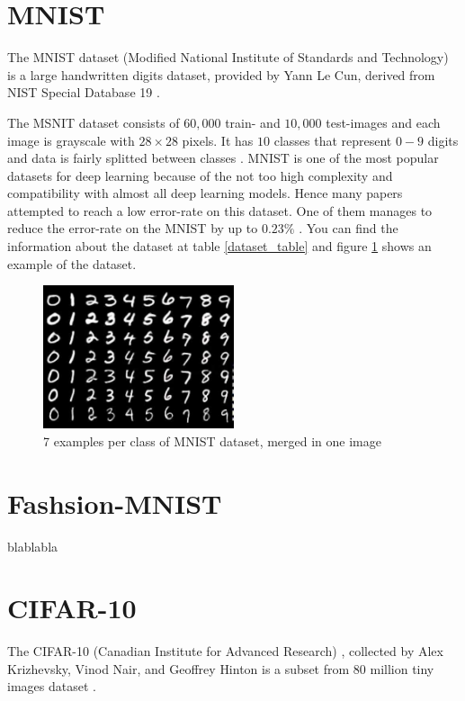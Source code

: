 \section{MNIST}
The MNIST dataset (Modified National Institute of Standards and Technology) is a large handwritten
digits dataset, provided by Yann Le Cun, derived from NIST Special Database 19 \cite{NIST}.

The MSNIT dataset consists of $60,000$ train- and $10,000$ test-images and each image is grayscale
with $28 \times 28$ pixels. It has $10$ classes that represent $0-9$ digits and data is fairly
splitted between classes \cite{MNIST_data_reference}. MNIST is one of the most popular datasets for
deep learning because of the not too high complexity and compatibility with almost all deep learning
models. Hence many papers attempted to reach a low error-rate on this dataset. One of them manages
to reduce the error-rate on the MNIST by up to $0.23\%$ \cite{MNIST_best_result_reference}. You can
find the information about the dataset at table
\ref{dataset_table} and figure \ref{fig:mnist_dataset_example} shows an example of the dataset.

\begin{figure}
  \centering
  \label{fig:mnist_dataset_example}
  \includegraphics[width=0.5\textwidth]{fig/mnist}
  \caption{7 examples per class of MNIST dataset, merged in one image \cite{MNIST_dataset_example}}
\end{figure}


\section{Fashsion-MNIST}
blablabla


\section{CIFAR-10}
The CIFAR-10 (Canadian Institute for Advanced Research)
, collected by Alex Krizhevsky, Vinod Nair, and Geoffrey Hinton is a subset from 80 million tiny
images dataset \cite{CIFAR-10_origin_dataset}.

